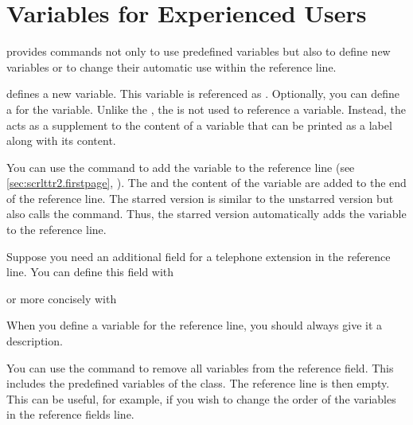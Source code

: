 \section{Variables for Experienced Users}
\BeginIndexGroup
{}

\KOMAScript{} provides commands not only to use predefined variables but also
to define new variables or to change their automatic use within the reference
line.

\begin{Declaration}
\end{Declaration}
 defines a new variable. This variable is referenced as
. Optionally, you can define a  for the
 variable. Unlike the , the  is not
used to reference a variable. Instead, the  acts as a
supplement to the content of a variable that can be printed as a label along
with its content.

You can use the  command to add the 
variable to the reference line (see
\autoref{sec:scrlttr2.firstpage}, ). The
 and the content of the variable are added to the end of
the reference line. The starred version  is similar to the
unstarred version but also calls the  command. Thus, the
starred version automatically adds the variable to the reference line.
\begin{Example}
  Suppose you need an additional field for a telephone extension in the
  reference line. You can define this field with
\begin{lstcode}
\end{lstcode}
  or more concisely with
\begin{lstcode}
\end{lstcode}
\end{Example}
When you define a variable for the reference line, you
should always give it a description.

You can use the  command to remove all variables from
the reference field. This includes the predefined variables of the class. The
reference line is then empty. This can be useful, for example, if you wish to
change the order of the variables in the reference fields line.

